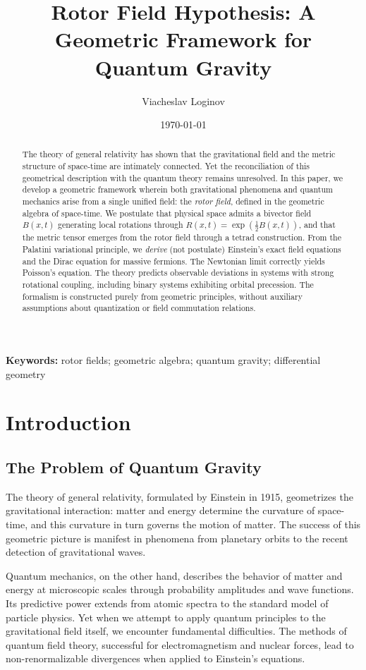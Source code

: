 \documentclass[11pt,a4paper]{article}
\title{Rotor Field Hypothesis: A Geometric Framework for Quantum Gravity}
\author[1]{Viacheslav Loginov}
\affil[1]{Kyiv, Ukraine\\ \texttt{barthez.slavik@gmail.com}}
\date{\today} %
\numberwithin{equation}{section}
\theoremstyle{plain}
\theoremstyle{definition}
\theoremstyle{remark}
\newcommand{\keywords}{\textbf{Keywords:} rotor fields; geometric algebra; quantum gravity; differential geometry}
\begin{document}
\maketitle

\begin{abstract}
The theory of general relativity has shown that the gravitational field and the metric structure of space-time are intimately connected. Yet the reconciliation of this geometrical description with the quantum theory remains unresolved. In this paper, we develop a geometric framework wherein both gravitational phenomena and quantum mechanics arise from a single unified field: the \emph{rotor field}, defined in the geometric algebra of space-time. We postulate that physical space admits a bivector field $B(x,t)$ generating local rotations through $R(x,t)=\exp(\frac{1}{2}B(x,t))$, and that the metric tensor emerges from the rotor field through a tetrad construction. From the Palatini variational principle, we \emph{derive} (not postulate) Einstein's exact field equations and the Dirac equation for massive fermions. The Newtonian limit correctly yields Poisson's equation. The theory predicts observable deviations in systems with strong rotational coupling, including binary systems exhibiting orbital precession. The formalism is constructed purely from geometric principles, without auxiliary assumptions about quantization or field commutation relations.
\end{abstract}

\keywords

\section{Introduction}
\label{sec:intro}

\subsection{The Problem of Quantum Gravity}

The theory of general relativity, formulated by Einstein in 1915, geometrizes the gravitational interaction: matter and energy determine the curvature of space-time, and this curvature in turn governs the motion of matter. The success of this geometric picture is manifest in phenomena from planetary orbits to the recent detection of gravitational waves.

Quantum mechanics, on the other hand, describes the behavior of matter and energy at microscopic scales through probability amplitudes and wave functions. Its predictive power extends from atomic spectra to the standard model of particle physics. Yet when we attempt to apply quantum principles to the gravitational field itself, we encounter fundamental difficulties. The methods of quantum field theory, successful for electromagnetism and nuclear forces, lead to non-renormalizable divergences when applied to Einstein's equations.
\end{document}
